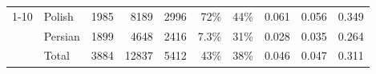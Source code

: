 \begin{table}[t]
\begin{tabular}{llrrrr|rrrr}
\cline{1-10}
\multirow{3}{*}{Experienced} & Polish &                  1985 &                       8189 &                  2996 &                    72\% &                                                44\% &                 0.061 &                          0.056&       0.349 \\
            & Persian &                  1899 &                       4648 &                  2416 &                     7.3\%&                                                31\% &                 0.028 &                           0.035&       0.264 \\
            & Total &                  3884 &                      12837 &                  5412 &                    43\% &                                                38\% &                 0.046 &                           0.047&       0.311 \\
\bottomrule

\end{tabular}
\label{table:participants}
\end{table}
